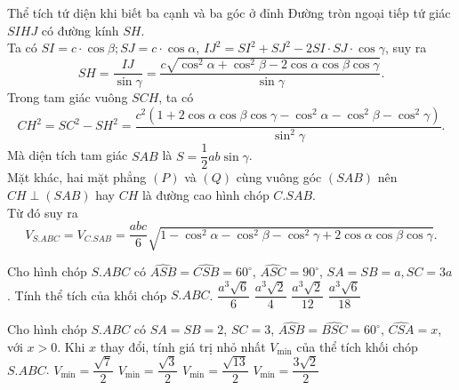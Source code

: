 \begin{dang}{Thể tích tứ diện khi biết ba cạnh và ba góc ở đỉnh}
	Đường tròn ngoại tiếp tứ giác $SIHJ$ có đường kính $SH$.\\
	Ta có $SI=c\cdot \cos \beta; SJ=c\cdot \cos \alpha$, $IJ^2=SI^2+SJ^2-2SI\cdot SJ \cdot \cos \gamma$, suy ra $$SH=\dfrac{IJ}{\sin \gamma}=\dfrac{c \sqrt{\cos^2 \alpha + \cos ^2 \beta -2 \cos \alpha \cos \beta \cos \gamma}}{\sin \gamma}.$$
	Trong tam giác vuông $SCH$, ta có 
	$$CH^2=SC^2-SH^2=\dfrac{c^2(1+2 \cos \alpha \cos \beta \cos \gamma -\cos^2 \alpha - \cos^2 \beta - \cos^2 \gamma)}{\sin^2 \gamma}.$$
	Mà diện tích tam giác $SAB$ là $S=\dfrac{1}2 ab \sin \gamma$. \\
	Mặt khác, hai mặt phẳng $(P)$ và $(Q)$ cùng vuông góc $(SAB)$ nên $CH\perp (SAB)$ hay $CH$ là đường cao hình chóp $C.SAB$.\\
	Từ đó suy ra $$V_{S.ABC}=V_{C.SAB}=\dfrac{abc}{6} \sqrt{1-\cos^2 \alpha -\cos ^2 \beta - \cos^2 \gamma + 2 \cos \alpha \cos \beta \cos \gamma}.$$
\end{dang}
\begin{vd}%
	Cho hình chóp $S.ABC$ có $\widehat{ASB}=\widehat{CSB}=60^\circ$, $\widehat{ASC}=90^\circ$, $SA=SB=a, SC=3a$. Tính thể tích của khối chóp $S.ABC$.
	\choice
	{$\dfrac{a^3\sqrt{6}}{6}$}
	{\True $\dfrac{a^3\sqrt2}{4}$}
	{$\dfrac{a^3\sqrt2}{12}$}
	{$\dfrac{a^3\sqrt{6}}{18}$}
\end{vd}

\begin{vd}%
	Cho hình chóp $S.ABC$ có $SA=SB=2$, $SC=3$, $\widehat{ASB}=\widehat{BSC}=60^{\circ}$, $\widehat{CSA}=x$, với $x>0$. Khi $x$ thay đổi, tính giá trị nhỏ nhất $V_{\min}$ của thể tích khối chóp $S.ABC$.
	\choice
	{\True $V_{\min}= \dfrac{\sqrt{7}}2$}
	{$V_{\min}= \dfrac{\sqrt{3}}2$}
	{$V_{\min}=\dfrac{\sqrt{13}}2 $}
	{$V_{\min}= \dfrac{3\sqrt2}2$}
	
\end{vd}


